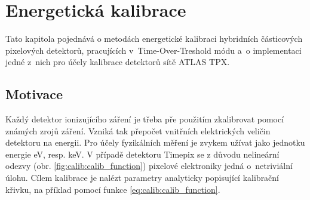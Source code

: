 

\chapter{Energetická kalibrace}\label{calib}
Tato kapitola pojednává o metodách energetické kalibraci hybridních částicových pixelových detektorů, pracujících v~Time-Over-Treshold módu a~o implementaci jedné z~nich pro účely kalibrace detektorů sítě ATLAS TPX.

\section{Motivace}

Každý detektor ionizujícího záření je třeba pře použitím zkalibrovat pomocí známých zrojů záření. Vzniká tak přepočet vnitřních elektrických veličin detektoru na energii. Pro účely fyzikálních měření je zvykem užívat jako jednotku energie eV, resp. keV. 
V případě detektoru Timepix se z důvodu nelineární odezvy (obr. \ref{fig:calib:calib_function}) pixelové elektroniky jedná o~netriviální úlohu. Cílem kalibrace je nalézt parametry analyticky popisující kalibrační křivku, na příklad pomocí funkce \ref{eq:calib:calib_function}.

